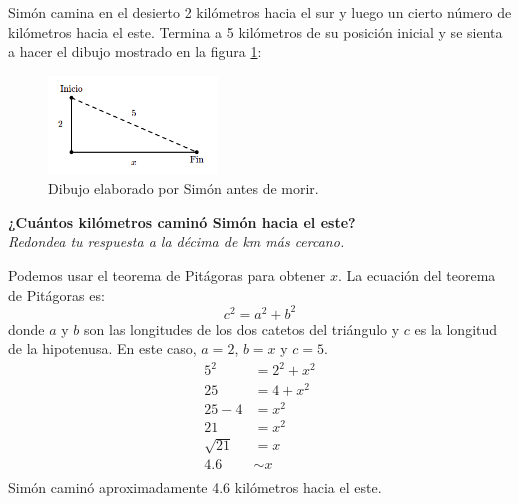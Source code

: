 Simón camina en el desierto 2 kilómetros hacia el sur y luego un cierto número de kilómetros hacia el este.
Termina a 5 kilómetros de su posición inicial y se sienta a hacer el dibujo mostrado en la figura \ref{fig:proverb_pitagoras_01}:
\begin{figure}[H]
    \begin{center}
        \includegraphics[width=0.4\textwidth]{../images/proverb_pitagoras_01.png}
    \end{center}
    \caption{Dibujo elaborado por Simón antes de morir.}
    \label{fig:proverb_pitagoras_01}
\end{figure}

\textbf{¿Cuántos kilómetros caminó Simón hacia el este?}\\
\textit{Redondea tu respuesta a la décima de km más cercano.}

\begin{solutionbox}{10cm}
    Podemos usar el teorema de Pitágoras para obtener $x$.
    La ecuación del teorema de Pitágoras es:
    \[c^2=a^2+b^2\]
    donde $a$ y $b$ son las longitudes de los dos catetos del triángulo y $c$ es la longitud de la hipotenusa.
    En este caso, $a=2$, $b=x$ y $c=5$.
    \begin{align*}
        5^2       & =2^2+x^2  \\
        25        & = 4 + x^2 \\
        25-4      & =x^2      \\
        21        & =x^2      \\
        \sqrt{21} & =x        \\
        4.6       & \sim x    \\
    \end{align*}
    Simón caminó aproximadamente 4.6 kilómetros hacia el este.
\end{solutionbox}